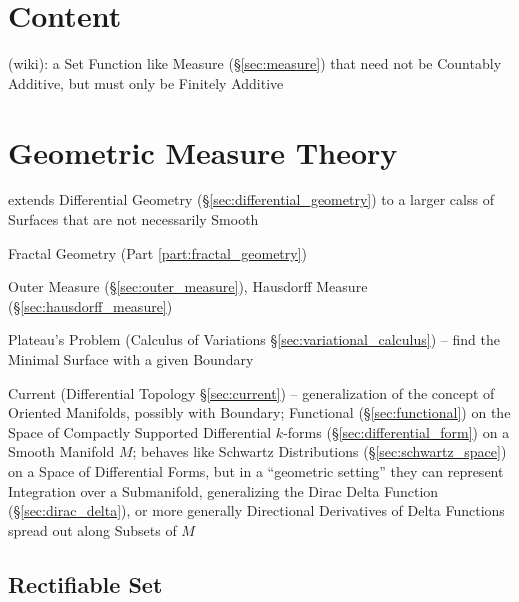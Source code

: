 \section{Content}\label{sec:content}

(wiki): a Set Function like Measure (\S\ref{sec:measure}) that need not be
Countably Additive, but must only be Finitely Additive



\section{Geometric Measure Theory}\label{sec:gmt}

extends Differential Geometry (\S\ref{sec:differential_geometry}) to a larger
calss of Surfaces that are not necessarily Smooth

\fist Fractal Geometry (Part \ref{part:fractal_geometry})

Outer Measure (\S\ref{sec:outer_measure}),
Hausdorff Measure (\S\ref{sec:hausdorff_measure})

Plateau's Problem (Calculus of Variations \S\ref{sec:variational_calculus}) --
find the Minimal Surface with a given Boundary

Current (Differential Topology \S\ref{sec:current}) --
generalization of the concept of Oriented Manifolds, possibly with Boundary;
Functional (\S\ref{sec:functional}) on the Space of Compactly Supported
Differential $k$-forms (\S\ref{sec:differential_form}) on a Smooth Manifold $M$;
behaves like Schwartz Distributions (\S\ref{sec:schwartz_space}) on a Space of
Differential Forms, but in a ``geometric setting'' they can represent
Integration over a Submanifold, generalizing the Dirac Delta Function
(\S\ref{sec:dirac_delta}), or more generally Directional Derivatives of Delta
Functions spread out along Subsets of $M$



\subsection{Rectifiable Set}\label{sec:rectifiable_set}

